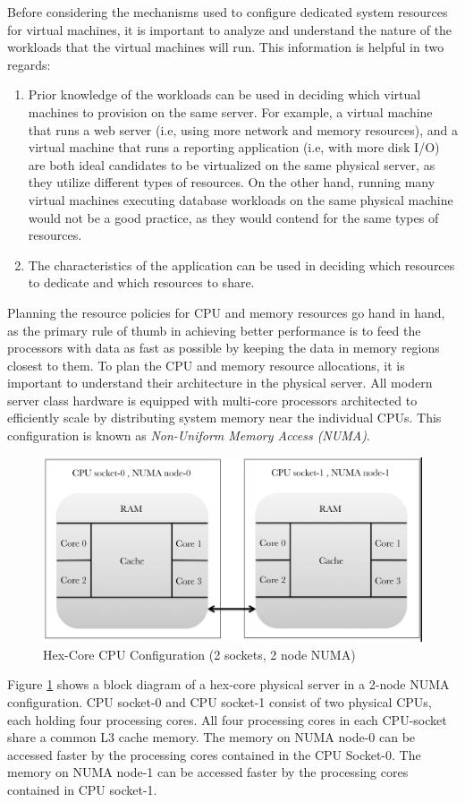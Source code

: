 Before considering the mechanisms used to configure dedicated system resources for virtual machines, it is important to analyze and understand the nature of the workloads that the virtual machines will run. This information is helpful in two regards:
\begin{enumerate}
\item Prior knowledge of the workloads can be used in deciding which virtual machines to provision on the same server. For example, a virtual machine that runs a web server (i.e, using  more network and memory resources), and a virtual machine that runs a reporting application (i.e, with more disk I/O) are both ideal candidates to be virtualized on the same physical server, as they utilize different types of resources. On the other hand, running many virtual machines executing database workloads on the same physical machine would not be a good practice, as they would contend for the same types of resources.
\item The characteristics of the application can be used in deciding which resources to dedicate and which resources to share.
\end{enumerate}
Planning the resource policies for CPU and memory resources go hand in hand, as the primary rule of thumb in achieving better performance is to feed the processors with data as fast as possible by keeping the data in memory regions closest to them. To plan the CPU and memory resource allocations, it is important to understand their architecture in the physical server. All modern server class hardware is equipped with multi-core processors architected to efficiently scale by distributing system memory near the individual CPUs. This configuration is known as \textit{Non-Uniform Memory Access (NUMA)}. 
\begin{figure}[H]
\centering
\includegraphics[width=130mm]{numa.png}
\caption{Hex-Core CPU Configuration (2 sockets, 2 node NUMA) }
\label{fig:numa}
\end{figure}
Figure \ref{fig:numa} shows a block diagram of a hex-core physical server in a 2-node NUMA configuration. CPU socket-0 and CPU socket-1 consist of two physical CPUs, each holding four processing cores. All four processing cores in each CPU-socket share a common L3 cache memory. The memory on NUMA node-0 can be accessed faster by the processing cores contained in the CPU Socket-0. The memory on NUMA node-1 can be accessed faster by the processing cores contained in CPU socket-1.


